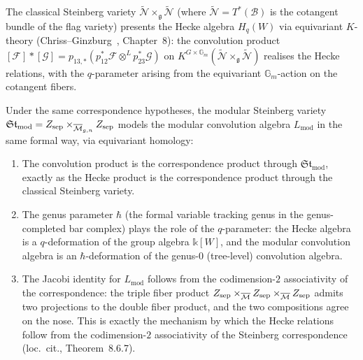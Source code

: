 \begin{remark}
\label{rem:hecke-parallel}
The classical Steinberg variety
$\widetilde{\mathcal{N}} \times_{\mathfrak{g}}
\widetilde{\mathcal{N}}$ (where
$\widetilde{\mathcal{N}} = T^\ast(\mathcal{B})$ is the
cotangent bundle of the flag variety) presents the Hecke
algebra $H_q(W)$ via equivariant $K$-theory
(Chriss--Ginzburg~\cite{CG97}, Chapter~8): the convolution
product
$[\mathcal{F}] \ast [\mathcal{G}] =
p_{13,\ast}(p_{12}^\ast \mathcal{F} \otimes^L
p_{23}^\ast \mathcal{G})$
on $K^{G \times \mathbb{G}_m}
(\widetilde{\mathcal{N}}
\times_{\mathfrak{g}} \widetilde{\mathcal{N}})$
realises the Hecke relations, with the $q$-parameter arising
from the equivariant $\mathbb{G}_m$-action on the cotangent
fibers.

Under the same correspondence hypotheses, the modular Steinberg variety
$\mathfrak{St}_{\mathrm{mod}} = Z_{\mathrm{sep}}
\times_{\overline{\mathcal{M}}_{g,n}} Z_{\mathrm{sep}}$
models the modular convolution algebra $L_{\mathrm{mod}}$ in the same
formal way, via equivariant homology:
\begin{enumerate}[label=\textup{(\roman*)}]
\item The convolution product is the correspondence product
 through $\mathfrak{St}_{\mathrm{mod}}$, exactly as the Hecke
 product is the correspondence product through the classical
 Steinberg variety.
\item The genus parameter $\hbar$ (the formal variable tracking
 genus in the genus-completed bar complex) plays the role of
 the $q$-parameter: the Hecke algebra is a
 $q$-deformation of the group algebra $\mathbb{k}[W]$, and
 the modular convolution algebra is an $\hbar$-deformation of
 the genus-$0$ (tree-level) convolution algebra.
\item The Jacobi identity for $L_{\mathrm{mod}}$ follows from
 the codimension-$2$ associativity of the correspondence:
 the triple fiber product
 $Z_{\mathrm{sep}} \times_{\overline{\mathcal{M}}}
 Z_{\mathrm{sep}} \times_{\overline{\mathcal{M}}} Z_{\mathrm{sep}}$
 admits two projections to the double fiber product, and the
 two compositions agree on the nose. This is exactly the
 mechanism by which the Hecke relations follow from the
 codimension-$2$ associativity of the Steinberg correspondence
 (loc.\ cit., Theorem~8.6.7).
\end{enumerate}
\end{remark}

